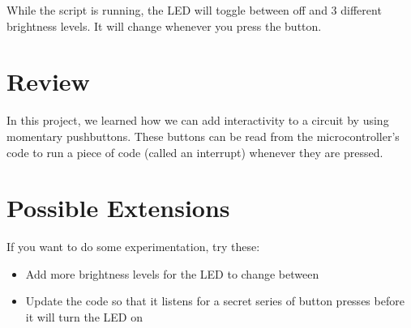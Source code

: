 While the script is running, the LED will toggle between off and 3 different brightness levels. It will
change whenever you press the button.

\section{Review}
In this project, we learned how we can add interactivity to a circuit by using momentary pushbuttons.
These buttons can be read from the microcontroller's code to run a piece of code (called an interrupt)
whenever they are pressed.

\section{Possible Extensions}
If you want to do some experimentation, try these:

\begin{itemize}
    \item Add more brightness levels for the LED to change between
    \item Update the code so that it listens for a secret series of button presses before it will turn the LED on
\end{itemize}
